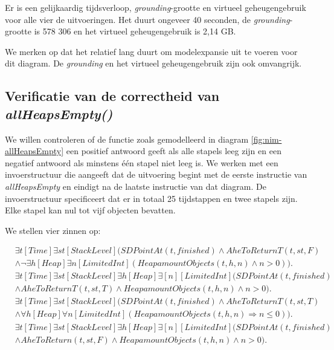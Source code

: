 Er is een gelijkaardig tijdsverloop, \textit{grounding}-grootte en virtueel geheugengebruik voor alle vier de uitvoeringen. Het duurt ongeveer 40 seconden, de \textit{grounding}-grootte is 578 306 en het virtueel geheugengebruik is 2,14 GB.

We merken op dat het relatief lang duurt om modelexpansie uit te voeren voor dit diagram. De \textit{grounding} en het virtueel geheugengebruik zijn ook omvangrijk.

\subsection{Verificatie van de correctheid van \textit{allHeapsEmpty()}}\label{sec:verify-ahe}

We willen controleren of de functie zoals gemodelleerd in diagram \ref{fig:nim-allHeapsEmpty} een positief antwoord geeft als alle stapels leeg zijn en een negatief antwoord als minstens \'e\'en stapel niet leeg is. We werken met een invoerstructuur die aangeeft dat de uitvoering begint met de eerste instructie van \textit{allHeapsEmpty} en eindigt na de laatste instructie van dat diagram. De invoerstructuur specificeert dat er in totaal 25 tijdstappen en twee stapels zijn. Elke stapel kan nul tot vijf objecten bevatten.

We stellen vier zinnen op:

\begin{align}
	\nonumber&\exists{t}[Time]\exists{st}[StackLevel](SDPointAt(t, finished) \land AheToReturnT(t, st, F) \\ &\land \lnot\exists{h}[Heap]\exists{n}[LimitedInt](HeapamountObjects(t, h, n) \land n > 0)).\label{form:ahe_fnonempty} \\
	\nonumber&\exists{t}[Time]\exists{st}[StackLevel]\exists{h}[Heap]\exists[n][LimitedInt](SDPointAt(t, finished) \\ &\land AheToReturnT(t, st, T) \land HeapamountObjects(t, h, n) \land n > 0).\label{form:ahe_fempty} \\
	\nonumber&\exists{t}[Time]\exists{st}[StackLevel](SDPointAt(t, finished) \land AheToReturnT(t, st, T) \\ &\land \forall{h}[Heap]\forall{n}[LimitedInt](HeapamountObjects(t, h, n) \Rightarrow n \leq 0)).\label{form:ahe_cempty} \\
	\nonumber&\exists{t}[Time]\exists{st}[StackLevel]\exists{h}[Heap]\exists[n][LimitedInt](SDPointAt(t, finished) \\ &\land AheToReturn(t, st, F) \land HeapamountObjects(t, h, n) \land n > 0).\label{form:ahe_cnonempty}
\end{align}

